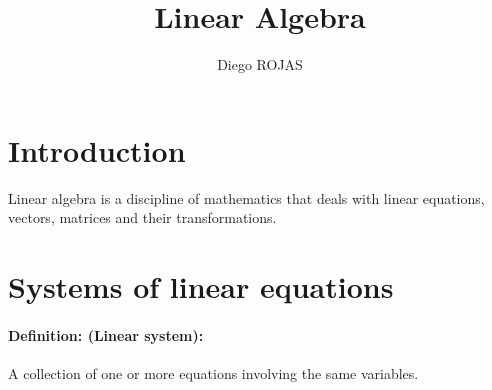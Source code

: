 \documentclass[12pt]{article}
\title{Linear Algebra}
\author{Diego ROJAS}
\newcommand{\xdefinition}[2]{\paragraph{\colorbox{#1!30}{\textbf{Definition:}} (#2):}}
\begin{document}
\maketitle

\section{Introduction}

Linear algebra is a discipline of mathematics that deals with linear equations, vectors, matrices and their transformations.

\section{Systems of linear equations}

\xdefinition{green}{Linear system} A collection of one or more equations involving the same variables.
\end{document}
